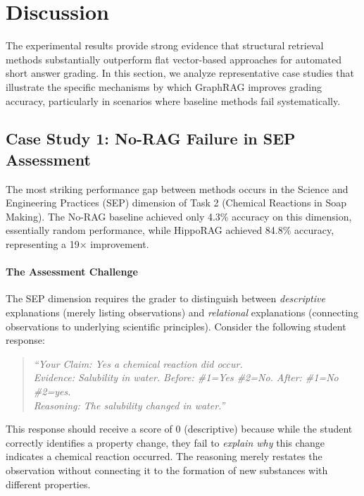 \documentclass{edm_article}
\begin{document}
\section{Discussion}
The experimental results provide strong evidence that structural retrieval methods substantially outperform flat vector-based approaches for automated short answer grading. In this section, we analyze representative case studies that illustrate the specific mechanisms by which GraphRAG improves grading accuracy, particularly in scenarios where baseline methods fail systematically.


\subsection{Case Study 1: No-RAG Failure in SEP Assessment}

The most striking performance gap between methods occurs in the Science and Engineering Practices (SEP) dimension of Task 2 (Chemical Reactions in Soap Making). The No-RAG baseline achieved only 4.3\% accuracy on this dimension, essentially random performance, while HippoRAG achieved 84.8\% accuracy, representing a 19$\times$ improvement.

\paragraph{The Assessment Challenge}
The SEP dimension requires the grader to distinguish between \textit{descriptive} explanations (merely listing observations) and \textit{relational} explanations (connecting observations to underlying scientific principles). Consider the following student response:

\begin{quote}
\vspace{-16pt}
\textit{``Your Claim: Yes a chemical reaction did occur.}\\
\textit{Evidence: Salubility in water. Before: \#1=Yes \#2=No. After: \#1=No \#2=yes.}\\
\textit{Reasoning: The salubility changed in water.''}
\vspace{-16pt}
\end{quote}

This response should receive a score of 0 (descriptive) because while the student correctly identifies a property change, they fail to \textit{explain why} this change indicates a chemical reaction occurred. The reasoning merely restates the observation without connecting it to the formation of new substances with different properties.
\end{document}
